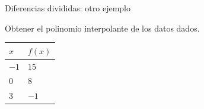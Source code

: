 \documentclass[original_version/main.tex]{subfiles}
\begin{document}
\begin{frame}[t]{Diferencias divididas: otro ejemplo}
\par\noindent\begin{minipage}[t][12mm][t]{\textwidth}\small\strut Obtener el polinomio interpolante de los datos dados.\end{minipage}\par\nointerlineskip
\begingroup\small\setlength{\tabcolsep}{3pt}\begin{center}\begin{tabular}{|C{.2\textwidth}|C{.2\textwidth}|}\hline
\rule[-2mm]{0pt}{6mm}$x$&$f(x)$\\\hline
\rule[-2.5mm]{0pt}{7mm}$-1$&$15$\\\hline
\rule[-2.5mm]{0pt}{7mm}$0$&$8$\\\hline
\rule[-2.5mm]{0pt}{7mm}$3$&$-1$\\\hline
\end{tabular}\end{center}\endgroup\par

\end{frame}
\end{document}
